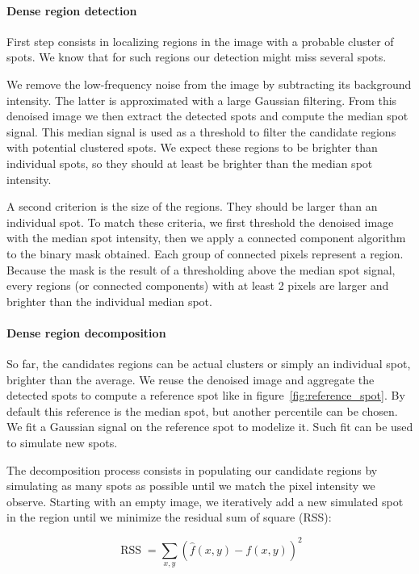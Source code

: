 \paragraph{Dense region detection}

First step consists in localizing regions in the image with a probable cluster of spots.
We know that for such regions our detection might miss several spots.

We remove the low-frequency noise from the image by subtracting its background intensity.
The latter is approximated with a large Gaussian filtering.
From this denoised image we then extract the detected spots and compute the median spot signal.
This median signal is used as a threshold to filter the candidate regions with potential clustered spots.
We expect these regions to be brighter than individual spots, so they should at least be brighter than the median spot intensity.

A second criterion is the size of the regions.
They should be larger than an individual spot.
To match these criteria, we first threshold the denoised image with the median spot intensity, then we apply a connected component algorithm\cite{wu_connected_component_2005} to the binary mask obtained.
Each group of connected pixels represent a region.
Because the mask is the result of a thresholding above the median spot signal, every regions (or connected components) with at least 2 pixels are larger and brighter than the individual median spot.

\paragraph{Dense region decomposition}

So far, the candidates regions can be actual clusters or simply an individual spot, brighter than the average.
We reuse the denoised image and aggregate the detected spots to compute a reference spot like in figure~\ref{fig:reference_spot}.
By default this reference is the median spot, but another percentile can be chosen.
We fit a Gaussian signal on the reference spot to modelize it.
Such fit can be used to simulate new spots.

The decomposition process consists in populating our candidate regions by simulating as many spots as possible until we match the pixel intensity we observe.
Starting with an empty image, we iteratively add a new simulated spot in the region until we minimize the residual sum of square (RSS):

\begin{equation}
	{\displaystyle \operatorname{RSS} =\sum _{x, y}(\hat{f}(x, y) - f(x, y))^{2}}
\end{equation}

